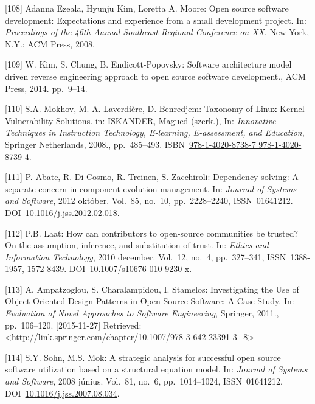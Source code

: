 \documentclass[12pt,magyar,a4paper,oneside]{scrreprt}
\newenvironment{cslreferences}%
  {}%
  {\par}
\begin{document}
\begin{cslreferences}
\leavevmode\hypertarget{ref-adanna_ezeala_open_2008}{}%
{[}108{]} Adanna Ezeala, Hyunju Kim, Loretta A. Moore: Open source
software development: Expectations and experience from a small
development project. In: \emph{Proceedings of the 46th Annual Southeast
Regional Conference on XX}, New York, N.Y.: ACM Press, 2008.

\leavevmode\hypertarget{ref-kim_software_2014}{}%
{[}109{]} W. Kim, S. Chung, B. Endicott-Popovsky: Software architecture
model driven reverse engineering approach to open source software
development., ACM Press, 2014. pp.~9--14.

\leavevmode\hypertarget{ref-mokhov_taxonomy_2008}{}%
{[}110{]} S.A. Mokhov, M.-A. Laverdière, D. Benredjem: Taxonomy of Linux
Kernel Vulnerability Solutions. in: ISKANDER, Magued (szerk.), In:
\emph{Innovative Techniques in Instruction Technology, E-learning,
E-assessment, and Education}, Springer Netherlands, 2008., pp.~485--493.
ISBN~\href{https://worldcat.org/isbn/978-1-4020-8738-7\%20978-1-4020-8739-4}{978-1-4020-8738-7 978-1-4020-8739-4}.

\leavevmode\hypertarget{ref-abate_dependency_2012}{}%
{[}111{]} P. Abate, R. Di Cosmo, R. Treinen, S. Zacchiroli: Dependency
solving: A separate concern in component evolution management. In:
\emph{Journal of Systems and Software}, 2012 október. Vol.~85, no.~10,
pp.~2228--2240, ISSN~01641212.
DOI~\href{https://doi.org/10.1016/j.jss.2012.02.018}{10.1016/j.jss.2012.02.018}.

\leavevmode\hypertarget{ref-laat_how_2010}{}%
{[}112{]} P.B. Laat: How can contributors to open-source communities be
trusted? On the assumption, inference, and substitution of trust. In:
\emph{Ethics and Information Technology}, 2010 december. Vol.~12, no.~4,
pp.~327--341, ISSN~1388-1957, 1572-8439.
DOI~\href{https://doi.org/10.1007/s10676-010-9230-x}{10.1007/s10676-010-9230-x}.

\leavevmode\hypertarget{ref-ampatzoglou_investigating_2011}{}%
{[}113{]} A. Ampatzoglou, S. Charalampidou, I. Stamelos: Investigating
the Use of Object-Oriented Design Patterns in Open-Source Software: A
Case Study. In: \emph{Evaluation of Novel Approaches to Software
Engineering}, Springer, 2011., pp.~106--120. {[}2015-11-27{]} Retrieved:
\textless{}\url{http://link.springer.com/chapter/10.1007/978-3-642-23391-3_8}\textgreater{}

\leavevmode\hypertarget{ref-sohn_strategic_2008}{}%
{[}114{]} S.Y. Sohn, M.S. Mok: A strategic analysis for successful open
source software utilization based on a structural equation model. In:
\emph{Journal of Systems and Software}, 2008 június. Vol.~81, no.~6,
pp.~1014--1024, ISSN~01641212.
DOI~\href{https://doi.org/10.1016/j.jss.2007.08.034}{10.1016/j.jss.2007.08.034}.


\end{cslreferences}
\end{document}
